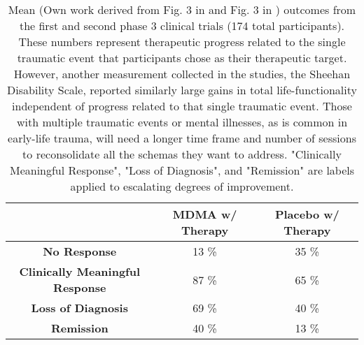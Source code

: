 \documentclass[12pt,letterpaper]{book}
\begin{document}
\FloatBarrier
\begin{table}[h!]
    \centering
    \caption{Mean (Own work derived from Fig. 3 in \textcite{mitchellMDMAClinicalTrial} and Fig. 3 in \textcite{mitchellMDMAClinicalTrial2}) outcomes from the first and second phase 3 clinical trials (174 total participants). These numbers represent therapeutic progress related to the single traumatic event that participants chose as their therapeutic target. However, another measurement collected in the studies, the Sheehan Disability Scale, reported similarly large gains in total life-functionality independent of progress related to that single traumatic event. Those with multiple traumatic events or mental illnesses, as is common in early-life trauma, will need a longer time frame and number of sessions to reconsolidate all the schemas they want to address. "Clinically Meaningful Response", "Loss of Diagnosis", and "Remission" are labels applied to escalating degrees of improvement.}
    \label{table:efficacy}
    \begin{tabular}{|c|c|c|}
    \hline
     & \textbf{MDMA w/ Therapy} & \textbf{Placebo w/ Therapy} \\ \hline
    \textbf{No Response}          & 13 \%          & 35 \%          \\ \hline
    \textbf{Clinically Meaningful Response}          & 87 \%          & 65 \%         \\ \hline
    \textbf{Loss of Diagnosis} & 69 \% & 40 \% \\ \hline
    \textbf{Remission}          & 40 \%          & 13 \%          \\ \hline
    \end{tabular}
\end{table}
\FloatBarrier
\end{document}
